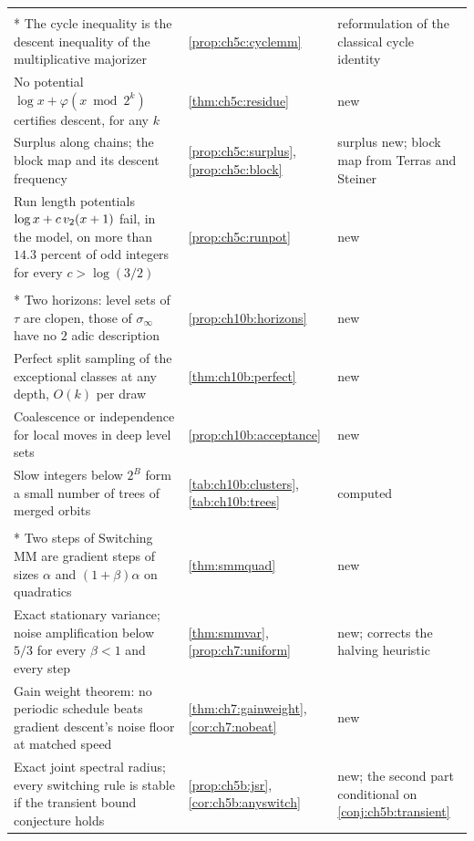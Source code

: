 {\begin{longtable}{@{}p{}>{\raggedright\arraybackslash}p{}>{\raggedright\arraybackslash}p{}@{}}
\addlinespace[4pt]
\multicolumn{3}{@{}l}{\itshape Majorization pressed to its limit}\\*
\addlinespace[2pt]
The cycle inequality is the descent inequality of the multiplicative majorizer & \cref{prop:ch5c:cyclemm} & reformulation of the classical cycle identity \\
No potential $\log x+\varphi(x\bmod2^k)$ certifies descent, for any $k$ & \cref{thm:ch5c:residue} & new \\
Surplus along chains; the block map and its descent frequency & \cref{prop:ch5c:surplus}, \cref{prop:ch5c:block} & surplus new; block map from Terras and Steiner \\
Run length potentials $\log x+c\,v_2(x+1)$ fail, in the model, on more than $14.3$ percent of odd integers for every $c>\log(3/2)$ & \cref{prop:ch5c:runpot} & new \\
\addlinespace[4pt]
\multicolumn{3}{@{}l}{\itshape Simulation}\\*
\addlinespace[2pt]
Two horizons: level sets of $\tau$ are clopen, those of $\sigma_\infty$ have no $2$ adic description & \cref{prop:ch10b:horizons} & new \\
Perfect split sampling of the exceptional classes at any depth, $O(k)$ per draw & \cref{thm:ch10b:perfect} & new \\
Coalescence or independence for local moves in deep level sets & \cref{prop:ch10b:acceptance} & new \\
Slow integers below $2^B$ form a small number of trees of merged orbits & \cref{tab:ch10b:clusters}, \cref{tab:ch10b:trees} & computed \\
\addlinespace[4pt]
\multicolumn{3}{@{}l}{\itshape The optimizer}\\*
\addlinespace[2pt]
Two steps of Switching MM are gradient steps of sizes $\alpha$ and $(1+\beta)\alpha$ on quadratics & \cref{thm:smmquad} & new \\
Exact stationary variance; noise amplification below $5/3$ for every $\beta<1$ and every step & \cref{thm:smmvar}, \cref{prop:ch7:uniform} & new; corrects the halving heuristic \\
Gain weight theorem: no periodic schedule beats gradient descent's noise floor at matched speed & \cref{thm:ch7:gainweight}, \cref{cor:ch7:nobeat} & new \\
Exact joint spectral radius; every switching rule is stable if the transient bound conjecture holds & \cref{prop:ch5b:jsr}, \cref{cor:ch5b:anyswitch} & new; the second part conditional on \cref{conj:ch5b:transient} \\

\end{longtable}}
